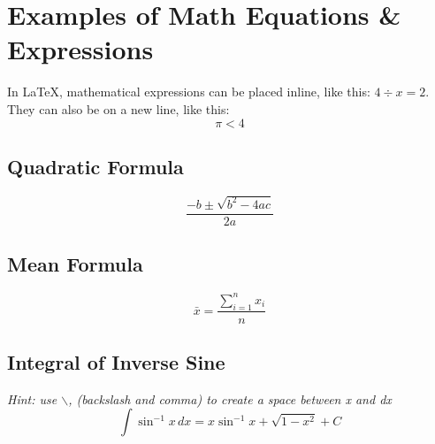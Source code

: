 \section{Examples of Math Equations \& Expressions}
In LaTeX, mathematical expressions can be placed inline, like this: \(4 \div x = 2\).
They can also be on a new line, like this: \[\pi < 4\]
\subsection{Quadratic Formula} \[\frac{-b\pm\sqrt{b^{2}-4ac}}{2a}\]
\subsection{Mean Formula} \[\bar{x}=\frac{\sum_{i=1}^{n}x_{i}}{n}\]
\subsection{Integral of Inverse Sine} 
\textit{Hint: use $\backslash$, (backslash and comma) to create a space between x and dx}\[\int \sin^{-1}x\,dx=x\sin^{-1}x+\sqrt{1-x^{2}}+C\]